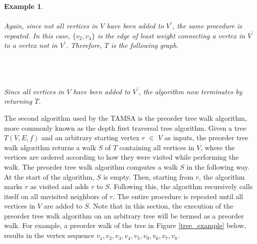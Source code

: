 \documentclass[12pt]{article}
\newtheorem{example}[definition]{Example}
\numberwithin{equation}{subsection}
\numberwithin{table}{subsection}
\numberwithin{algorithm}{subsection}
\begin{document}
\begin{example}
\\\\
Again, since not all vertices in $V$ have been added to $V^\prime$, the same procedure is repeated. In this case, $\{v_2, v_4\}$ is the edge of least weight connecting a vertex in $V^\prime$ to a vertex not in $V^\prime$. Therefore, $T$ is the following graph.\\\\
\\\\
Since all vertices in $V$ have been added to $V^\prime$, the algorithm now terminates by returning $T$.
\end{example}
The second algorithm used by the TAMSA is the preorder tree walk algorithm, more commonly known as the depth first traversal tree algorithm. Given a tree $T(V,E,f)$ and an arbitrary starting vertex $r$ $\in$ $V$ as inputs, the preorder tree walk algorithm returns a walk $S$ of $T$ containing all vertices in $V$, where the vertices are ordered according to how they were visited while performing the walk. The preorder tree walk algorithm computes a walk $S$ in the following way. At the start of the algorithm, $S$ is empty. Then, starting from $r$, the algorithm marks $r$ as visited and adds $r$ to $S$. Following this, the algorithm recursively calls itself on all unvisited neighbors of $r$. The entire procedure is repeated until all vertices in $V$ are added to $S$. Note that in this section, the execution of the preorder tree walk algorithm on an arbitrary tree will be termed as a preorder walk. For example, a preorder walk of the tree in Figure \ref{tree_example} below, results in the vertex sequence $v_1, v_2, v_3, v_4, v_5, v_9, v_6, v_7, v_8$. \cite{cormen_leiserson_rivest_stein}\\\\
\end{document}
